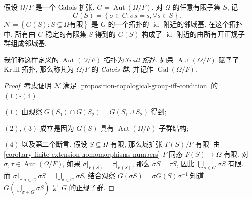 \begin{proposition}
  \label{proposition-Galois-group-definition}
  假设 \( \Omega/F \) 是一个 Galois 扩张, \( G = \operatorname{Aut}(\Omega/F)
  \). 对 \( \Omega \) 的任意有限子集 \( S \), 记
  \[
    G(S) = \left\lbrace \sigma \in G: \sigma s = s, \forall s \in S
    \right\rbrace.
  \]
  \( \mathcal{N} = \left\lbrace G(S): S \subseteq \Omega \text{有限}
  \right\rbrace \) 是 \( G \) 的一个拓扑的 \( \operatorname{id} \) 附近的邻域基.
  在这个拓扑中, 所有由 \( G \)-稳定的有限集 \( S \) 得到的 \( G(S) \) 构成了 \(
  \operatorname{id} \) 附近的由所有开正规子群组成邻域基.

  我们称这样定义的 \( \operatorname{Aut}(\Omega/F) \) 拓扑为\emph{Krull 拓扑}.
  如果 \( \operatorname{Aut}(\Omega/F) \) 赋予了 Krull 拓扑, 那么称其为 \(
  \Omega / F \) 的\emph{ Galois 群}, 并记作 \( \operatorname{Gal}(\Omega/F) \).
\end{proposition}
\begin{proof}
  考虑证明 \( \mathcal{N} \) 满足
  \cref{proposition-topological-group-iff-condition} 的 \( (1) \text{-} (4) \).

  \( (1) \) 由观察 \( G(S_1) \cap G(S_2) = G(S_1 \cup S_2) \) 得到;

  \( (2), (3) \) 成立是因为 \( G(S) \) 具有 \( \operatorname{Aut}(\Omega/F) \)
  子群结构;

  \( (4) \) 以及第二个断言.
  假设 \( S \subseteq \Omega \) 有限, 那么域扩张 \( F(S) / F \) 有限.
  由\cref{corollary-finite-extension-homomorphisms-numbers} \( F \)-同态 \(
  F(S) \to \Omega \) 有限.
  对 \( \sigma, \tau \in \operatorname{Aut}(\Omega/F) \), 如果 \( \left. \sigma
    \right\vert_{F(S)} = \left. \tau \right\vert_{F(S)} \), 那么 \( \sigma S =
  \tau S \), 因此 \( \bigcup_{\sigma \in G} \sigma S \) 有限.
  而 \( \sigma \bigcup_{\sigma \in G} \sigma S = \bigcup_{\sigma \in G} \sigma S
  \), 结合观察 \( G(\sigma S) = \sigma G(S)\sigma^{-1} \) 知道 \(
  G(\bigcup_{\sigma\in G} \sigma S) \) 是 \( G \) 的正规子群.
\end{proof}


